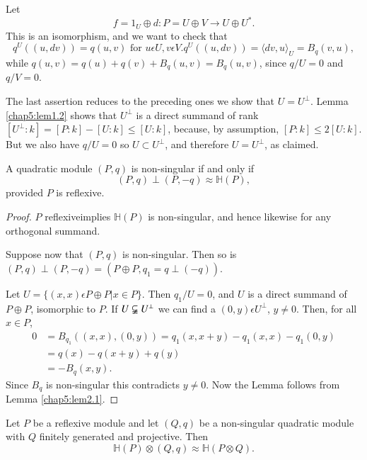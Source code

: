 Let 
$$
f= 1_U \oplus d : P = U \oplus V \to U \oplus U^*. 
$$
This is an isomorphism, and we want to check that 
$$
q^U((u, dv)) = q(u, v) \text{ for } u \epsilon U, v \epsilon
V. q^U((u, dv)) = \langle dv, u \rangle_U = B_q (v, u), 
$$
while $q(u, v) = q(u) + q(v) + B_q(u, v) = B_q (u, v)$, since $q/U =0$
and $q/V=0$. 

The last assertion reduces to the preceding ones we show that $U =
U^\perp$. Lemma \ref{chap5:lem1.2} shows that $U^\perp$ is a direct
summand of rank 
$[ U^\perp : k] = [ P : k]- [ U : k ]\leq [ U : k]$, because, by
assumption, $[P : k] \leq 2 [ U : k]$. But we also have $q/U = 0$ so
$U \subset U^\perp$, and therefore $U = U^\perp$, as claimed. 

\begin{lemma}\label{chap5:lem2.2} %
A quadratic module $(P, q)$ is non-singular if and only if
$$
(P, q) \perp (P, -q) \approx \mathbb{H} (P), 
$$
provided $P$ is reflexive.
\end{lemma}

\begin{proof}%
$P$ reflexive\pageoriginale implies $\mathbb{H}(P)$ is non-singular, and hence
  likewise for any orthogonal summand. 

Suppose now that $(P, q)$ is non-singular. Then so is $(P, q) \perp
(P, -q) = (P \oplus P, q_1 = q \perp (-q))$. 

Let $U = \{(x, x) \epsilon P \oplus P| x \in P\}$. Then $q_1/U = 0$,
and $U$ is a direct summand of $P \oplus P$, isomorphic to $P$. If $U
\varsubsetneqq U^\perp$ we can find a $(0, y) \epsilon U^\perp$, $y
\neq 0$. Then, for all $x \in P$, 
\begin{align*}
0 & = B_{q_1} ((x,x), (0, y)) = q_1 (x, x+y) - q_1 (x, x) - q_1 (0, y) \\
& = q(x) - q(x+y) + q(y) \\
& = - B_q (x, y).
\end{align*}
Since $B_q$ is non-singular this contradicts $y \neq 0$. Now the
Lemma follows from Lemma \ref{chap5:lem2.1}. 
\end{proof}

\begin{lemma}\label{chap5:lem2.3}%
 Let $P$ be a reflexive module and let $(Q, q)$ be a non-singular
 quadratic module with $Q$ finitely generated and projective. Then 
$$
\mathbb{H} (P) \otimes (Q, q) \approx \mathbb{H} (P \otimes Q). 
$$
\end{lemma}

